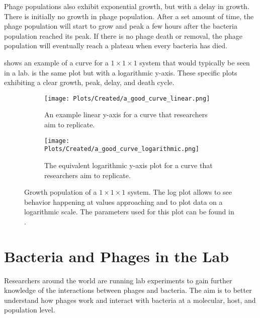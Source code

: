 Phage populations also exhibit exponential growth, but with a delay in growth. 
There is initially no growth in phage population. 
After a set amount of time, the phage population will start to grow and peak a few hours after the bacteria population reached its peak. 
If there is no phage death or removal, the phage population will eventually reach a plateau when every bacteria has died. 

 shows an example of a curve for a $1\times1\times1$ system that would typically be seen in a lab. 
 is the same plot but with a logarithmic y-axis. 
These specific plots exhibiting a clear growth, peak, delay, and death cycle. 

\begin{figure}[h!]
    \centering
    \begin{subfigure}{1\linewidth}
        \centering
        \captionsetup{width=1\linewidth}
        \texttt{[image: Plots/Created/a\_good\_curve\_linear.png]}
        \caption{
            An example linear y-axis for a curve that researchers aim to replicate. 
        }
        \label{fig:created:a_good_curve_linear}
    \end{subfigure}
    \hfill
    \begin{subfigure}{1\linewidth}
        \centering
        \captionsetup{width=1\linewidth}
        \texttt{[image: Plots/Created/a\_good\_curve\_logarithmic.png]}
        \caption{
            The equivalent logarithmic y-axis plot for a curve that researchers aim to replicate. 
        }
        \label{fig:created:a_good_curve_logarithmic}
    \end{subfigure}
    \caption{
        Growth population of a $1\times1\times1$ system. 
        The log plot allows to see behavior happening at values approaching and to plot data on a logarithmic scale. 
        The parameters used for this plot can be found in . 
    }
    \label{fig:created:a_good_curve}
\end{figure}

\section{Bacteria and Phages in the Lab}
Researchers around the world are running lab experiments to gain further knowledge of the interactions between phages and bacteria. 
The aim is to better understand how phages work and interact with bacteria at a molecular, host, and population level. 

